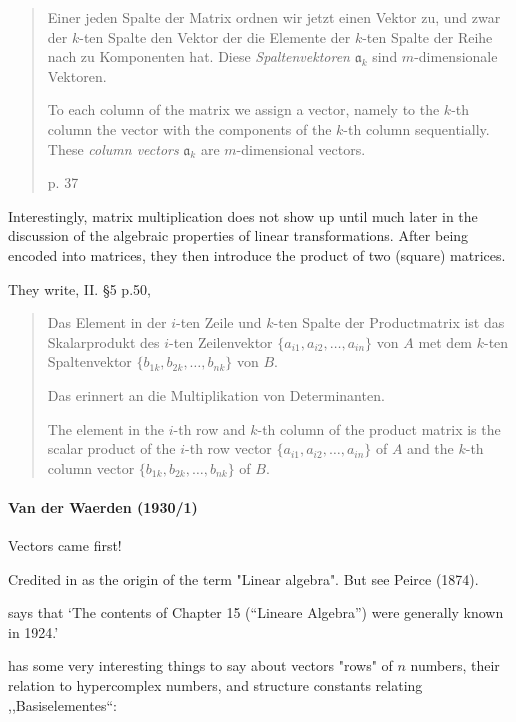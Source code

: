 \begin{quote}
    Einer jeden Spalte der Matrix ordnen wir jetzt einen Vektor zu, und zwar der
    $k$-ten Spalte den Vektor der die Elemente der $k$-ten Spalte der Reihe nach
    zu Komponenten hat. Diese \textit{Spaltenvektoren} $\mathfrak a_k$ sind
    $m$-dimensionale Vektoren.

    To each column of the matrix we assign a vector, namely to the $k$-th column
    the vector with the components of the $k$-th column sequentially.
    These \textit{column vectors} $\mathfrak a_k$ are $m$-dimensional vectors.

    p. 37
\end{quote}


Interestingly, matrix multiplication does not show up until much later in the
discussion of the algebraic properties of linear transformations. After being
encoded into matrices, they then introduce the product of two (square) matrices.

They write, II. \S 5 p.50,

\begin{quote}
Das Element in der $i$-ten Zeile und $k$-ten Spalte der Productmatrix ist das
Skalarprodukt des $i$-ten Zeilenvektor $\{a_{i1}, a_{i2}, \dots, a_{in}\}$
von $A$ met dem $k$-ten Spaltenvektor $\{b_{1k}, b_{2k}, \dots, b_{nk}\}$ von $B$.

Das erinnert an die Multiplikation von Determinanten.

The element in the $i$-th row and $k$-th column of the product matrix is the
scalar product of the $i$-th row vector $\{a_{i1}, a_{i2}, \dots, a_{in}\}$ of $A$
and the $k$-th column vector $\{b_{1k}, b_{2k}, \dots, b_{nk}\}$ of $B$.
\end{quote}



\paragraph{Van der Waerden (1930/1)~\cite{vdWaerden1930,vdWaerden1931}}

Vectors came first!


Credited in \cite{Kleiner2007} as the origin of the term "Linear algebra". But see
Peirce (1874).

\cite[p. 36]{vdWaerden1975} says that `The contents of Chapter 15 (``Lineare Algebra'') were generally
known in 1924.'


\cite[\S 10, pp. 43-44]{vdWaerden1930} has some very interesting things to say about vectors "rows" of $n$ numbers,
their relation to hypercomplex numbers, and structure constants relating ,,Basiselementes``:

